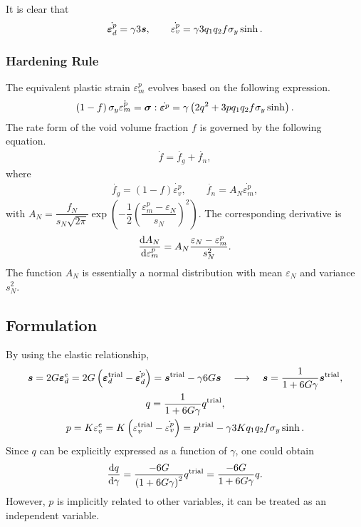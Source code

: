 It is clear that
\begin{gather}
    \dot{\bm{\varepsilon}^p_d}=\gamma3\bm{s},\qquad
    \dot{\varepsilon^p_v}=\gamma3q_1q_2f\sigma_y\sinh.
\end{gather}
\subsubsection{Hardening Rule}
The equivalent plastic strain $\varepsilon^p_m$ evolves based on the following expression.
\begin{gather}
\left(1-f\right)\sigma_y\dot{\varepsilon^p_m}=\bm{\sigma}:\dot{\bm{\varepsilon}^p}=\gamma\left(2q^2+3pq_1q_2f\sigma_y\sinh\right).
\end{gather}
The rate form of the void volume fraction $f$ is governed by the following equation.
\begin{gather}
\dot{f}=\dot{f_g}+\dot{f_n},
\end{gather}
where
\begin{gather}
\dot{f_g}=\left(1-f\right)\dot{\varepsilon^p_v},\qquad
\dot{f_n}=A_N\dot{\varepsilon^p_m},
\end{gather}
with $A_N=\dfrac{f_N}{s_N\sqrt{2\pi}}\exp\left(-\dfrac{1}{2}\left(\dfrac{\varepsilon^p_m-\varepsilon_N}{s_N}\right)^2\right)$. The corresponding derivative is
\begin{gather}
\dfrac{\mathrm{d}A_N}{\mathrm{d}\varepsilon^p_m}=A_N\dfrac{\varepsilon_N-\varepsilon^p_m}{s_N^2}.
\end{gather}
The function $A_N$ is essentially a normal distribution with mean $\varepsilon_N$ and variance $s_N^2$.
\subsection{Formulation}
By using the elastic relationship,
\begin{gather}
    \bm{s}=2G\bm{\varepsilon}^e_d=2G\left(\bm{\varepsilon}^\text{trial}_d-\dot{\bm{\varepsilon}^p_d}\right)=\bm{s}^\text{trial}-\gamma6G\bm{s}\quad\longrightarrow\quad\bm{s}=\dfrac{1}{1+6G\gamma}\bm{s}^\text{trial},\\
    q=\dfrac{1}{1+6G\gamma}q^\text{trial},\\
    p=K\varepsilon^e_v=K\left(\varepsilon^\text{trial}_v-\dot{\varepsilon^p_v}\right)=p^\text{trial}-\gamma3Kq_1q_2f\sigma_y\sinh.
\end{gather}
Since $q$ can be explicitly expressed as a function of $\gamma$, one could obtain
\begin{gather}
    \dfrac{\mathrm{d}q}{\mathrm{d}\gamma}=\dfrac{-6G}{\left(1+6G\gamma\right)^2}q^\text{trial}=\dfrac{-6G}{1+6G\gamma}q.
\end{gather}
However, $p$ is implicitly related to other variables, it can be treated as an independent variable.

